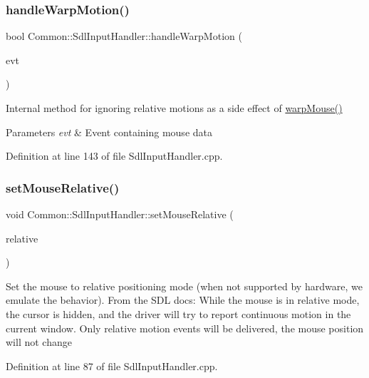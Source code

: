 \subsubsection{\texorpdfstring{handle\+Warp\+Motion()}{handleWarpMotion()}}
{\footnotesize\ttfamily bool Common\+::\+Sdl\+Input\+Handler\+::handle\+Warp\+Motion (\begin{DoxyParamCaption}\item[{const \hyperlink{struct_s_d_l___mouse_motion_event}{S\+D\+L\+\_\+\+Mouse\+Motion\+Event} \&}]{evt }\end{DoxyParamCaption})\hspace{0.3cm}{\ttfamily [private]}}

Internal method for ignoring relative motions as a side effect of \hyperlink{class_common_1_1_sdl_input_handler_a589923be034191404d6597dfc8cee282}{warp\+Mouse()} 
\begin{DoxyParams}{Parameters}
{\em evt} & Event containing mouse data \\
\hline
\end{DoxyParams}


Definition at line 143 of file Sdl\+Input\+Handler.\+cpp.

\mbox{\label{class_common_1_1_sdl_input_handler_a93f3c75fde51291eb985afbc1877dfb7}} 
\subsubsection{\texorpdfstring{set\+Mouse\+Relative()}{setMouseRelative()}}
{\footnotesize\ttfamily void Common\+::\+Sdl\+Input\+Handler\+::set\+Mouse\+Relative (\begin{DoxyParamCaption}\item[{bool}]{relative }\end{DoxyParamCaption})}

Set the mouse to relative positioning mode (when not supported by hardware, we emulate the behavior). From the S\+DL docs\+: While the mouse is in relative mode, the cursor is hidden, and the driver will try to report continuous motion in the current window. Only relative motion events will be delivered, the mouse position will not change 

Definition at line 87 of file Sdl\+Input\+Handler.\+cpp.

